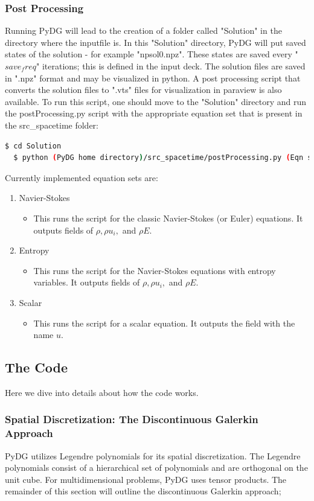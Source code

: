 \documentclass[times,12pt]{article}%
\begin{document}
\subsubsection{Post Processing}
Running PyDG will lead to the creation of a folder called "Solution" in the directory where the inputfile is. In this "Solution" directory, PyDG will put saved states of the solution - for example "npsol0.npz". These states are saved every "$save_freq$" iterations; this is defined in the input deck. The solution files are saved in ".npz" format and may be visualized in python. A post processing script that converts the solution files to ".vts" files for visualization in paraview is also available. To run this script, one should move to the "Solution" directory and run the postProcessing.py script with the appropriate equation set that is present in the src\_spacetime folder:
\begin{lstlisting}[language=bash]
  $ cd Solution 
  $ python (PyDG home directory)/src_spacetime/postProcessing.py (Eqn set)
\end{lstlisting}
Currently implemented equation sets are:
\begin{enumerate}
\item Navier-Stokes
\begin{itemize}
\item This runs the script for the classic Navier-Stokes (or Euler) equations. It outputs fields of $\rho, \rho u_i, $ and $\rho E$.
\end{itemize}
\item Entropy
\begin{itemize}
\item This runs the script for the Navier-Stokes equations with entropy variables. It outputs fields of $\rho, \rho u_i, $ and $\rho E$.
\end{itemize}
\item Scalar
\begin{itemize}
\item This runs the script for a scalar equation. It outputs the field with the name $u$.
\end{itemize}
\end{enumerate}

\subsection{The Code}
Here we dive into details about how the code works.

\subsubsection{Spatial Discretization: The Discontinuous Galerkin Approach}
PyDG utilizes Legendre polynomials for its spatial discretization. The Legendre polynomials consist of a hierarchical set of polynomials and are orthogonal on the unit cube. For multidimensional problems, PyDG uses tensor products. The remainder of this section will outline the discontinuous Galerkin approach;
\end{document}
